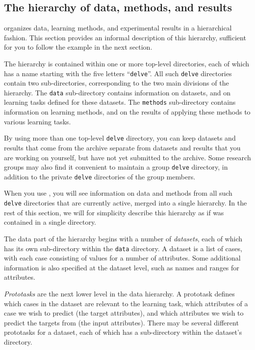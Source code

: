 
\subsection{The \delve{} hierarchy of data, methods, and 
            results}\label{intro-hierarchy}

\delve{} organizes data, learning methods, and experimental results in
a hierarchical fashion.  This section provides an informal description
of this hierarchy, sufficient for you to follow the example in the next
section.

The \delve{} hierarchy is contained within one or more top-level
directories, each of which has a name starting with the five letters
``\texttt{delve}''.  All such \texttt{delve} directories contain two
sub-directories, corresponding to the two main divisions of the
\delve{} hierarchy.  The \texttt{data} sub-directory contains information
on datasets, and on learning tasks defined for these datasets.  The
\texttt{methods} sub-directory contains information on learning methods,
and on the results of applying these methods to various learning
tasks.

By using more than one top-level \texttt{delve} directory, you can keep
datasets and results that come from the \delve{} archive separate from
datasets and results that you are working on yourself, but have not
yet submitted to the archive.  Some research groups may also find
it convenient to maintain a group \texttt{delve} directory, in addition
to the private \texttt{delve} directories of the group members.

When you use \delve{}, you will see information on data and methods
from all such \texttt{delve} directories that are currently active,
merged into a single hierarchy.  In the rest of this section, we will
for simplicity describe this hierarchy as if was contained in a single
directory.  

The data part of the hierarchy begins with a number of {\it datasets},
each of which has its own sub-directory within the \texttt{data}
directory.  A dataset is a list of cases, with each case consisting
of values for a number of attributes.  Some additional information is
also specified at the dataset level, such as names and ranges for
attributes.

\emph{Prototasks} are the next lower level in the data hierarchy.  A
prototask defines which cases in the dataset are relevant to the
learning task, which attributes of a case we wish to predict (the
target attributes), and which attributes we wish to predict the targets
from (the input attributes). There may be several different prototasks
for a dataset, each of which has a sub-directory within the dataset's
directory.


